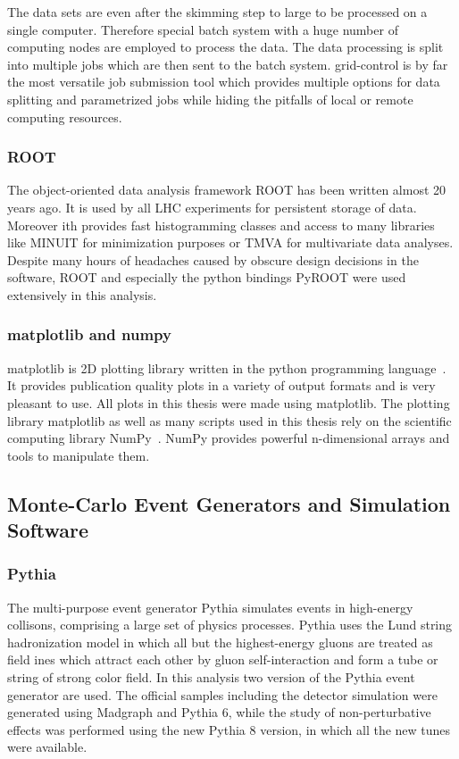 The data sets are even after the skimming step to large to be processed on a
single computer. Therefore special batch system with a huge number of computing
nodes are employed to process the data. The data processing is split into
multiple jobs which are then sent to the batch system. grid-control is by far
the most versatile job submission tool which provides multiple options for data
splitting and parametrized jobs while hiding the pitfalls of local or remote
computing resources.

\subsubsection{ROOT}

The object-oriented data analysis framework ROOT has been written almost 20 years
ago. It is used by all LHC experiments for persistent storage of data. Moreover
ith provides fast histogramming classes and access to many libraries like MINUIT
for minimization purposes or TMVA for multivariate data analyses. Despite
many hours of headaches caused by obscure design decisions in the software, ROOT
and especially the python bindings PyROOT were used extensively in this analysis.

\subsubsection{matplotlib and numpy}

matplotlib is 2D plotting library written in the python programming language~\cite{Hunter:2007aa}. It
provides publication quality plots in a variety of output formats and is very
pleasant to use. All plots in this thesis were made using matplotlib. The
plotting library matplotlib as well as many scripts used in this thesis rely on
the scientific computing library NumPy~\cite{Oliphant:2007aa}. NumPy provides
powerful n-dimensional arrays and tools to manipulate them. 

\subsection{Monte-Carlo Event Generators and Simulation Software}
\label{subsection:mc_generators}

\subsubsection{Pythia}

The multi-purpose event generator Pythia simulates events in high-energy
collisons, comprising a large set of physics processes. Pythia uses the Lund
string hadronization model in which all but the highest-energy gluons are
treated as field ines which attract each other by gluon self-interaction and
form a tube or string of strong color field. In this analysis two version of the
Pythia event generator are used. The official samples including the detector
simulation were generated using Madgraph and Pythia 6, while the study of
non-perturbative effects was performed using the new Pythia 8 version, in which
all the new tunes were available. 

